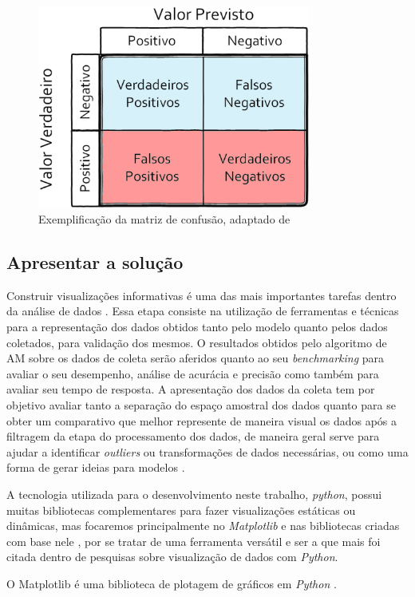 \begin{figure}[!htb]
	\centering
	\includegraphics[width=0.8\textwidth]{figuras/matriz_consusao.eps}
	\caption{Exemplificação da matriz de confusão, adaptado de }
	\label{matriz_consusao}
\end{figure}

\subsection{Apresentar a solução}
Construir visualizações informativas é uma das mais importantes tarefas dentro da análise de dados \cite{McKinney2012datapython}. Essa etapa consiste na utilização de ferramentas e técnicas para a representação dos dados obtidos tanto pelo modelo quanto pelos dados coletados, para validação dos mesmos. O resultados obtidos pelo algoritmo de AM sobre os dados de coleta serão aferidos quanto ao seu \textit{benchmarking} \cite{Benchmarking} para avaliar o seu desempenho, análise de acurácia e precisão como também para avaliar seu tempo de resposta. A apresentação dos dados da coleta tem por objetivo avaliar tanto a separação do espaço amostral dos dados quanto para se obter um comparativo que melhor represente de maneira visual os dados após a filtragem da etapa do processamento dos dados, de maneira geral serve para ajudar a identificar \textit{outliers} ou transformações de dados necessárias, ou como uma forma de gerar ideias para modelos \cite{McKinney2012datapython}.	
	
A tecnologia utilizada para o desenvolvimento neste trabalho, \textit{python}, possui muitas bibliotecas complementares para fazer visualizações estáticas ou dinâmicas, mas focaremos principalmente no \textit{Matplotlib} e nas bibliotecas criadas com base nele \cite{McKinney2012datapython}, por se tratar de uma ferramenta versátil e ser a que mais foi citada dentro de pesquisas sobre visualização de dados com \textit{Python}.

O Matplotlib é uma biblioteca de plotagem de gráficos em \textit{Python} \cite{Matplotlib}.
